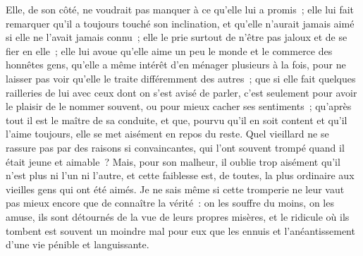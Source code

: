 \documentclass[french,twoside]{book} %
\begin{document}
Elle, de son côté, ne voudrait pas manquer à ce qu’elle lui a promis ; elle lui fait remarquer qu’il a toujours touché son inclination, et qu’elle n’aurait jamais aimé si elle ne l’avait jamais connu ; elle le prie surtout de n’être pas jaloux et de se fier en elle ; elle lui avoue qu’elle aime un peu le monde et le commerce des honnêtes gens, qu’elle a même intérêt d’en ménager plusieurs à la fois, pour ne laisser pas voir qu’elle le traite différemment des autres ; que si elle fait quelques railleries de lui avec ceux dont on s’est avisé de parler, c’est seulement pour avoir le plaisir de le nommer souvent, ou pour mieux cacher ses sentiments ; qu’après tout il est le maître de sa conduite, et que, pourvu qu’il en soit content et qu’il l’aime toujours, elle se met aisément en repos du reste. Quel vieillard ne se rassure pas par des raisons si convaincantes, qui l’ont souvent trompé quand il était jeune et aimable ? Mais, pour son malheur, il oublie trop aisément qu’il n’est plus ni l’un ni l’autre, et cette faiblesse est, de toutes, la plus ordinaire aux vieilles gens qui ont été aimés. Je ne sais même si cette tromperie ne leur vaut pas mieux encore que de connaître la vérité : on les souffre du moins, on les amuse, ils sont détournés de la vue de leurs propres misères, et le ridicule où ils tombent est souvent un moindre mal pour eux que les ennuis et l’anéantissement d’une vie pénible et languissante.
\end{document}
